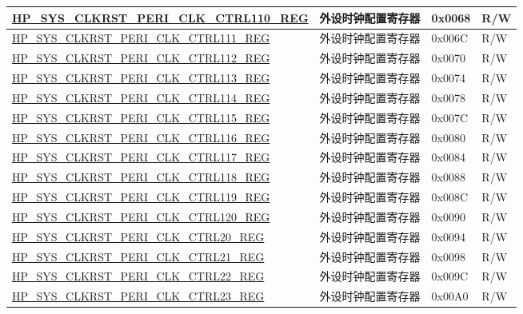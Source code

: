 \begin{longtable}{ | p{7.5cm} | p{6.2cm} | p{1.3cm} | p{1cm} | }
\hyperref[regdesc:HPSYSCLKRSTPERICLKCTRL110REG]{HP\_SYS\_CLKRST\_PERI\_CLK\_CTRL110\_REG} & 外设时钟配置寄存器  & 0x0068 & R/W \\ \hline
\hyperref[regdesc:HPSYSCLKRSTPERICLKCTRL111REG]{HP\_SYS\_CLKRST\_PERI\_CLK\_CTRL111\_REG} & 外设时钟配置寄存器  & 0x006C & R/W \\ \hline
\hyperref[regdesc:HPSYSCLKRSTPERICLKCTRL112REG]{HP\_SYS\_CLKRST\_PERI\_CLK\_CTRL112\_REG} & 外设时钟配置寄存器  & 0x0070 & R/W \\ \hline
\hyperref[regdesc:HPSYSCLKRSTPERICLKCTRL113REG]{HP\_SYS\_CLKRST\_PERI\_CLK\_CTRL113\_REG} & 外设时钟配置寄存器  & 0x0074 & R/W \\ \hline
\hyperref[regdesc:HPSYSCLKRSTPERICLKCTRL114REG]{HP\_SYS\_CLKRST\_PERI\_CLK\_CTRL114\_REG} & 外设时钟配置寄存器  & 0x0078 & R/W \\ \hline
\hyperref[regdesc:HPSYSCLKRSTPERICLKCTRL115REG]{HP\_SYS\_CLKRST\_PERI\_CLK\_CTRL115\_REG} & 外设时钟配置寄存器  & 0x007C & R/W \\ \hline
\hyperref[regdesc:HPSYSCLKRSTPERICLKCTRL116REG]{HP\_SYS\_CLKRST\_PERI\_CLK\_CTRL116\_REG} & 外设时钟配置寄存器  & 0x0080 & R/W \\ \hline
\hyperref[regdesc:HPSYSCLKRSTPERICLKCTRL117REG]{HP\_SYS\_CLKRST\_PERI\_CLK\_CTRL117\_REG} & 外设时钟配置寄存器  & 0x0084 & R/W \\ \hline
\hyperref[regdesc:HPSYSCLKRSTPERICLKCTRL118REG]{HP\_SYS\_CLKRST\_PERI\_CLK\_CTRL118\_REG} & 外设时钟配置寄存器  & 0x0088 & R/W \\ \hline
\hyperref[regdesc:HPSYSCLKRSTPERICLKCTRL119REG]{HP\_SYS\_CLKRST\_PERI\_CLK\_CTRL119\_REG} & 外设时钟配置寄存器  & 0x008C & R/W \\ \hline
\hyperref[regdesc:HPSYSCLKRSTPERICLKCTRL120REG]{HP\_SYS\_CLKRST\_PERI\_CLK\_CTRL120\_REG} & 外设时钟配置寄存器  & 0x0090 & R/W \\ \hline
\hyperref[regdesc:HPSYSCLKRSTPERICLKCTRL20REG]{HP\_SYS\_CLKRST\_PERI\_CLK\_CTRL20\_REG} & 外设时钟配置寄存器  & 0x0094 & R/W \\ \hline
\hyperref[regdesc:HPSYSCLKRSTPERICLKCTRL21REG]{HP\_SYS\_CLKRST\_PERI\_CLK\_CTRL21\_REG} & 外设时钟配置寄存器  & 0x0098 & R/W \\ \hline
\hyperref[regdesc:HPSYSCLKRSTPERICLKCTRL22REG]{HP\_SYS\_CLKRST\_PERI\_CLK\_CTRL22\_REG} & 外设时钟配置寄存器  & 0x009C & R/W \\ \hline
\hyperref[regdesc:HPSYSCLKRSTPERICLKCTRL23REG]{HP\_SYS\_CLKRST\_PERI\_CLK\_CTRL23\_REG} & 外设时钟配置寄存器  & 0x00A0 & R/W \\ \hline

\end{longtable}
